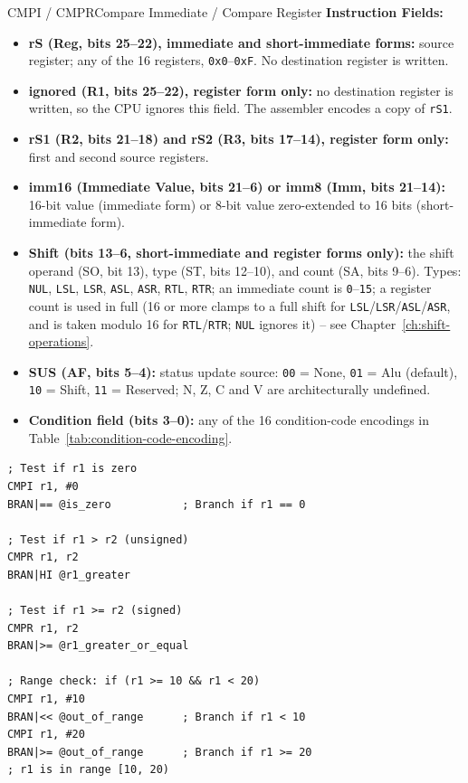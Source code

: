 \begin{instructionbox}{CMPI / CMPR}{Compare Immediate / Compare Register}
	\textbf{Instruction Fields:}
	\begin{itemize}
		\item \textbf{rS (Reg, bits 25--22), immediate and short-immediate forms:} source register; any of the 16 registers,
		      \texttt{0x0}--\texttt{0xF}. No destination register is written.
		\item \textbf{ignored (R1, bits 25--22), register form only:} no destination register is written, so the CPU ignores
		      this field. The assembler encodes a copy of \texttt{rS1}.
		\item \textbf{rS1 (R2, bits 21--18) and rS2 (R3, bits 17--14), register form only:} first and second source registers.
		\item \textbf{imm16 (Immediate Value, bits 21--6) or imm8 (Imm, bits 21--14):} 16-bit value (immediate form) or 8-bit
		      value zero-extended to 16 bits (short-immediate form).
		\item \textbf{Shift (bits 13--6, short-immediate and register forms only):} the shift operand (SO, bit 13), type (ST, bits 12--10), and count (SA, bits 9--6). Types:
		      \texttt{NUL}, \texttt{LSL},
		      \texttt{LSR}, \texttt{ASL}, \texttt{ASR}, \texttt{RTL}, \texttt{RTR}; an immediate count is
		      \texttt{0}--\texttt{15}; a register count is used in full (16 or more clamps to a full shift for \texttt{LSL}/\texttt{LSR}/\texttt{ASL}/\texttt{ASR}, and is taken modulo 16 for \texttt{RTL}/\texttt{RTR}; \texttt{NUL} ignores it) -- see Chapter~\ref{ch:shift-operations}.
		\item \textbf{SUS (AF, bits 5--4):} status update source: \texttt{00} = None, \texttt{01} = Alu (default), \texttt{10} = Shift, \texttt{11} =
		      Reserved; N, Z, C and V are architecturally undefined.
		\item \textbf{Condition field (bits 3--0):} any of the 16 condition-code encodings in
		      Table~\ref{tab:condition-code-encoding}.
	\end{itemize}

	\begin{example}
		\begin{lstlisting}
; Test if r1 is zero
CMPI r1, #0
BRAN|== @is_zero           ; Branch if r1 == 0

; Test if r1 > r2 (unsigned)
CMPR r1, r2
BRAN|HI @r1_greater

; Test if r1 >= r2 (signed)
CMPR r1, r2
BRAN|>= @r1_greater_or_equal

; Range check: if (r1 >= 10 && r1 < 20)
CMPI r1, #10
BRAN|<< @out_of_range      ; Branch if r1 < 10
CMPI r1, #20
BRAN|>= @out_of_range      ; Branch if r1 >= 20
; r1 is in range [10, 20)
		\end{lstlisting}
		\caption{Comparisons and Range Checking}
	\end{example}


\end{instructionbox}
